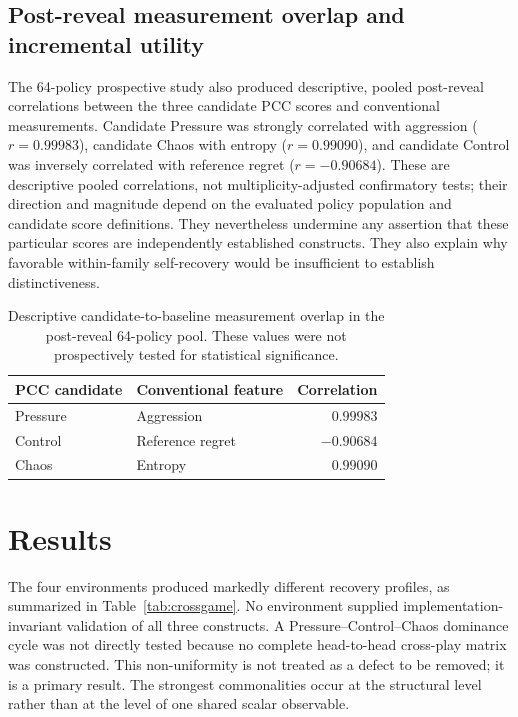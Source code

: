 \documentclass[journal]{IEEEtran}
\begin{document}
\subsection{Post-reveal measurement overlap and incremental utility}
\label{sec:overlap}
The 64-policy prospective study also produced descriptive, pooled post-reveal correlations between the three candidate PCC scores and conventional measurements. Candidate Pressure was strongly correlated with aggression ($r=0.99983$), candidate Chaos with entropy ($r=0.99090$), and candidate Control was inversely correlated with reference regret ($r=-0.90684$). These are descriptive pooled correlations, not multiplicity-adjusted confirmatory tests; their direction and magnitude depend on the evaluated policy population and candidate score definitions. They nevertheless undermine any assertion that these particular scores are independently established constructs. They also explain why favorable within-family self-recovery would be insufficient to establish distinctiveness.

\begin{table}[t]
\caption{Descriptive candidate-to-baseline measurement overlap in the post-reveal 64-policy pool. These values were not prospectively tested for statistical significance.}
\label{tab:overlap}
\centering\small
\begin{tabular}{llr}
\toprule
PCC candidate & Conventional feature & Correlation \\
\midrule
Pressure & Aggression & $0.99983$ \\
Control & Reference regret & $-0.90684$ \\
Chaos & Entropy & $0.99090$ \\
\bottomrule
\end{tabular}
\end{table}

\section{Results}

The four environments produced markedly different recovery profiles, as summarized in Table~\ref{tab:crossgame}. No environment supplied implementation-invariant validation of all three constructs. A Pressure--Control--Chaos dominance cycle was not directly tested because no complete head-to-head cross-play matrix was constructed. This non-uniformity is not treated as a defect to be removed; it is a primary result. The strongest commonalities occur at the structural level rather than at the level of one shared scalar observable.
\end{document}
